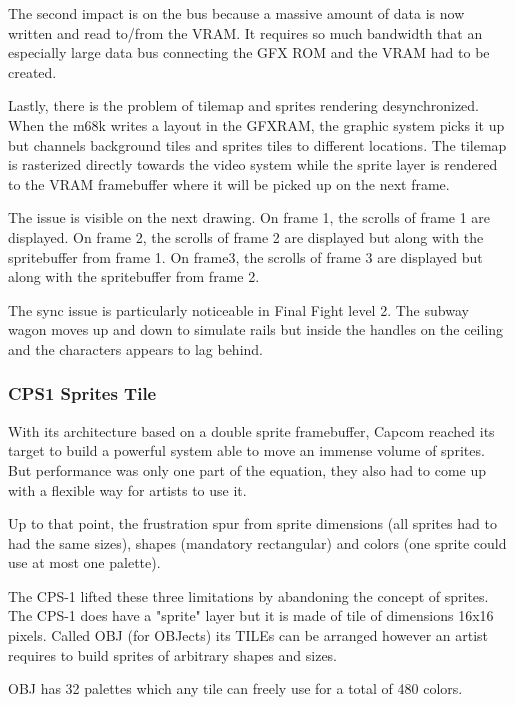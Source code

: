 The second impact is on the bus because a massive amount of data is now written and read to/from the VRAM. It requires so much bandwidth that an especially large data bus connecting the GFX ROM and the VRAM had to be created.

Lastly, there is the problem of tilemap and sprites rendering desynchronized. When the m68k writes a layout in the GFXRAM, the graphic system picks it up but channels background tiles and sprites tiles to different locations. The tilemap is rasterized directly towards the video system while the sprite layer is rendered to the VRAM framebuffer where it will be picked up on the next frame.
 


The issue is visible on the next drawing. On frame 1, the scrolls of frame 1 are displayed. On frame 2, the scrolls of frame 2 are displayed but along with the spritebuffer from frame 1. On frame3, the scrolls of frame 3 are displayed but along with the spritebuffer from frame 2. 


\begin{trivia}
The sync issue is particularly noticeable in Final Fight level 2. The subway wagon moves up and down to simulate rails but inside the handles on the ceiling and the characters appears to lag behind.
\end{trivia}

\subsubsection{CPS1 Sprites Tile}
With its architecture based on a double sprite framebuffer, Capcom reached its target to build a powerful system able to move an immense volume of sprites. But performance was only one part of the equation, they also had to come up with a flexible way for artists to use it.

Up to that point, the frustration spur from sprite dimensions (all sprites had to had the same sizes), shapes (mandatory rectangular) and colors (one sprite could use at most one palette). 

The CPS-1 lifted these three limitations by abandoning the concept of sprites. The CPS-1 does have a "sprite" layer but it is made of tile of dimensions 16x16 pixels. Called OBJ (for OBJects) its TILEs can be arranged however an artist requires to build sprites of arbitrary shapes and sizes. 

OBJ has 32 palettes which any tile can freely use for a total of 480 colors.




